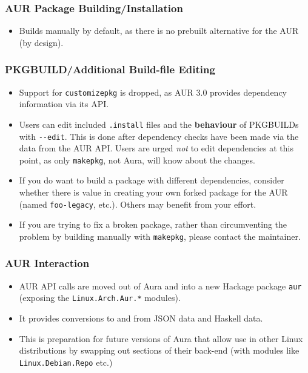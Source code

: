 \documentclass{article}
\begin{document}
\subsubsection{AUR Package
Building/Installation}\label{aur-package-buildinginstallation}

\begin{itemize}
\itemsep1pt\parskip0pt
\item
  Builds manually by default, as there is no prebuilt alternative for
  the AUR (by design).
\end{itemize}

\subsubsection{PKGBUILD/Additional Build-file
Editing}\label{pkgbuildadditional-build-file-editing}

\begin{itemize}
\itemsep1pt\parskip0pt
\item
  Support for \texttt{customizepkg} is dropped, as AUR 3.0 provides
  dependency information via its API.
\item
  Users can edit included \texttt{.install} files and the
  \textbf{behaviour} of PKGBUILDs with \texttt{-\/-edit}. This is done
  after dependency checks have been made via the data from the AUR API.
  Users are urged \emph{not} to edit dependencies at this point, as only
  \texttt{makepkg}, not Aura, will know about the changes.
\item
  If you do want to build a package with different dependencies,
  consider whether there is value in creating your own forked package
  for the AUR (named \texttt{foo-legacy}, etc.). Others may benefit from
  your effort.
\item
  If you are trying to fix a broken package, rather than circumventing
  the problem by building manually with \texttt{makepkg}, please contact
  the maintainer.
\end{itemize}

\subsubsection{AUR Interaction}\label{aur-interaction}

\begin{itemize}
\itemsep1pt\parskip0pt
\item
  AUR API calls are moved out of Aura and into a new Hackage package
  \texttt{aur} (exposing the \texttt{Linux.Arch.Aur.*} modules).
\item
  It provides conversions to and from JSON data and Haskell data.
\item
  This is preparation for future versions of Aura that allow use in
  other Linux distributions by swapping out sections of their back-end
  (with modules like \texttt{Linux.Debian.Repo} etc.)
\end{itemize}
\end{document}
